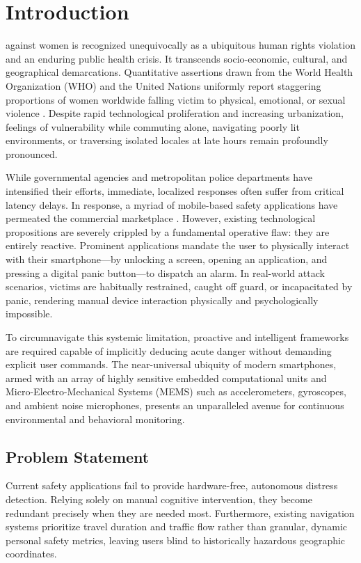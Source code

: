 \documentclass[10pt,journal,compsoc]{IEEEtran}
\begin{document}
\maketitle
\IEEEdisplaynontitleabstractindextext
\IEEEpeerreviewmaketitle

\section{Introduction}
 against women is recognized unequivocally as a ubiquitous human rights violation and an enduring public health crisis. It transcends socio-economic, cultural, and geographical demarcations. Quantitative assertions drawn from the World Health Organization (WHO) and the United Nations uniformly report staggering proportions of women worldwide falling victim to physical, emotional, or sexual violence \cite{who2013}. Despite rapid technological proliferation and increasing urbanization, feelings of vulnerability while commuting alone, navigating poorly lit environments, or traversing isolated locales at late hours remain profoundly pronounced. 

While governmental agencies and metropolitan police departments have intensified their efforts, immediate, localized responses often suffer from critical latency delays. In response, a myriad of mobile-based safety applications have permeated the commercial marketplace \cite{agarwal2020}. However, existing technological propositions are severely crippled by a fundamental operative flaw: they are entirely reactive. Prominent applications mandate the user to physically interact with their smartphone---by unlocking a screen, opening an application, and pressing a digital panic button---to dispatch an alarm. In real-world attack scenarios, victims are habitually restrained, caught off guard, or incapacitated by panic, rendering manual device interaction physically and psychologically impossible.

To circumnavigate this systemic limitation, proactive and intelligent frameworks are required capable of implicitly deducing acute danger without demanding explicit user commands. The near-universal ubiquity of modern smartphones, armed with an array of highly sensitive embedded computational units and Micro-Electro-Mechanical Systems (MEMS) such as accelerometers, gyroscopes, and ambient noise microphones, presents an unparalleled avenue for continuous environmental and behavioral monitoring.

\subsection{Problem Statement}
Current safety applications fail to provide hardware-free, autonomous distress detection. Relying solely on manual cognitive intervention, they become redundant precisely when they are needed most. Furthermore, existing navigation systems prioritize travel duration and traffic flow rather than granular, dynamic personal safety metrics, leaving users blind to historically hazardous geographic coordinates. 
\end{document}
